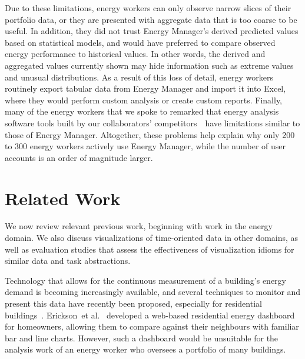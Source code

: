 \documentclass[journal]{vgtc}                %
\newcommand{\bstart}[1]{\vspace{1mm} \noindent{\textbf{#1:}}}
\newcommand{\etal}{et al.}
\begin{document}
\bstart{Summary} Due to these limitations, energy workers can only observe narrow slices of their portfolio data, or they are presented with aggregate data that is too coarse to be useful.
In addition, they did not trust Energy Manager's derived predicted values based on statistical models, and would have preferred to compare observed energy performance to historical values.
In other words, the derived and aggregated values currently shown may hide information such as extreme values and unusual distributions.
As a result of this loss of detail, energy workers routinely export tabular data from Energy Manager and import it into Excel, where they would perform custom analysis or create custom reports.
Finally, many of the energy workers that we spoke to remarked that energy analysis software tools built by our collaborators' competitors~\cite{Energent,Northwrite,Schneider}~have limitations similar to those of Energy Manager.
Altogether, these problems help explain why only 200 to 300 energy workers actively use Energy Manager, while the number of user accounts is an order of magnitude larger.


\section{Related Work}
\label{related-work}


We now review relevant previous work, beginning with work in the energy domain. 
We also discuss visualizations of time-oriented data in other domains, as well as evaluation studies that assess the effectiveness of visualization idioms for similar data and task abstractions.

\bstart{Visualization in the energy domain} Technology that allows for the continuous measurement of a building's energy demand is becoming increasingly available, and several techniques to monitor and present this data have recently been proposed, especially for residential buildings~\cite{Ellegard2011,Erickson2013,Goodwin2013,Rodgers2011}.
Erickson~\etal~\cite{Erickson2013} developed a web-based residential energy dashboard for homeowners, allowing them to compare against their neighbours with familiar bar and line charts.
However, such a dashboard would be unsuitable for the analysis work of an energy worker who oversees a portfolio of many buildings.
\end{document}
